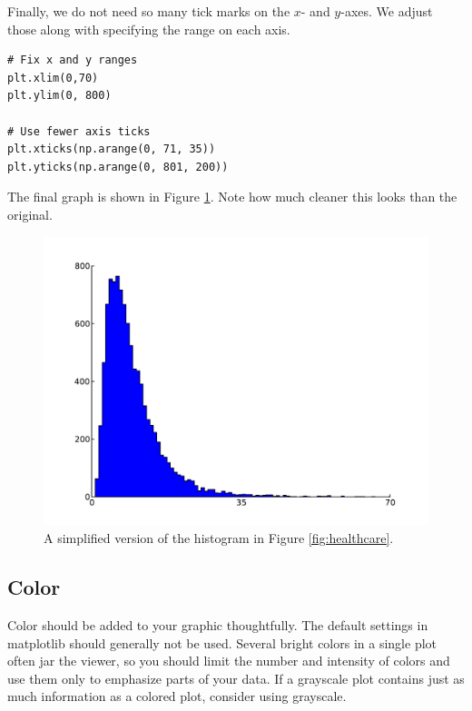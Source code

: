 Finally, we do not need so many tick marks on the $x$- and $y$-axes. 
We adjust those along with specifying the range on each axis.

\begin{lstlisting}
# Fix x and y ranges
plt.xlim(0,70)
plt.ylim(0, 800)

# Use fewer axis ticks
plt.xticks(np.arange(0, 71, 35))
plt.yticks(np.arange(0, 801, 200))
\end{lstlisting}

The final graph is shown in Figure \ref{fig:simplify}. 
Note how much cleaner this looks than the original.

\begin{figure}
\centering
\includegraphics[width=\textwidth]{simplify.pdf}
\caption{A simplified version of the histogram in Figure \ref{fig:healthcare}.}
\label{fig:simplify}
\end{figure}


\subsection*{Color}
Color should be added to your graphic thoughtfully. 
The default settings in matplotlib should generally not be used. 
Several bright colors in a single plot often jar the viewer, so you should limit the number and intensity of colors and use them only to emphasize parts of your data. 
If a grayscale plot contains just as much information as a colored plot, consider using grayscale.

